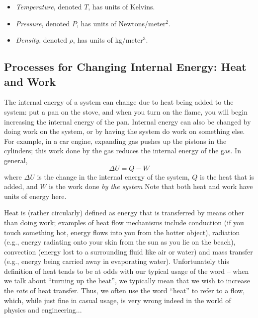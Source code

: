 \begin{itemize}
\item {\it Temperature}, denoted $T$, has units of Kelvins.
\item {\it Pressure}, denoted $P$, has units of Newtons/meter$^2$.
\item {\it Density}, denoted $\rho$, has units of kg/meter$^3$.
\end{itemize}

\subsection{Processes for Changing Internal Energy: Heat and Work}

The internal energy of a system can change due to heat being added to the system: put a pan on the stove, and when you turn on the flame, you will begin increasing the internal energy of the pan.   Internal energy can also be changed by doing work on the system, or by having the system do work on something else.  For example, in a car engine, expanding gas pushes up the pistons in the cylinders; this work done by the gas reduces the internal energy of the gas.  In general,
$$\Delta U = Q - W$$
where  $\Delta U$ is the change in the internal energy of the system, $Q$ is the heat that is added, and $W$ is the work done {\it by the system}   Note that both heat and work have units of energy here.  

Heat is (rather circularly) defined as energy that is transferred by means other than doing work; examples of heat flow mechanisms include conduction (if you touch something hot, energy flows into you from the hotter object), radiation (e.g., energy radiating onto your skin from the sun as you lie on the beach), convection (energy lost to a surrounding fluid like air or water) and mass transfer (e.g., energy being carried away in evaporating water).  Unfortunately this definition of heat tends to be at odds with our typical usage of the word -- when we talk about ``turning up the heat'', we typically mean that we wish to increase the {\it rate} of heat transfer. Thus, we often use the word ``heat'' to refer to a flow, which, while just fine in casual usage, is very wrong indeed in the world of physics and engineering...

